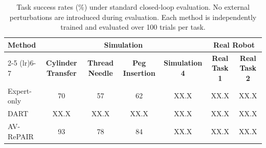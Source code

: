 \documentclass[letterpaper, 10 pt, conference]{ieeeconf}  %
\begin{document}

\begin{table}[t]
    \centering
    \caption{Task success rates (\%) under standard closed-loop evaluation. No external perturbations are introduced during evaluation. Each method is independently trained and evaluated over 100 trials per task.}
    \label{tab:main_results}
    \renewcommand{\arraystretch}{1.0}
    \begin{tabular*}{\textwidth}{
        @{\extracolsep{\fill}}
        lcccccc
        @{}
    }
        \toprule
        \multirow{2}{*}{\textbf{Method}}
        & \multicolumn{4}{c}{\textbf{Simulation}}
        & \multicolumn{2}{c}{\textbf{Real Robot}} \\
        \cmidrule(lr){2-5}
        \cmidrule(lr){6-7}
        & \textbf{Cylinder Transfer}
        & \textbf{Thread Needle}
        & \textbf{Peg Insertion}
        & \textbf{Simulation 4}
        & \textbf{Real Task 1}
        & \textbf{Real Task 2} \\
        \midrule
        Expert-only
        & 70 & 57 & 62
        & XX.X & XX.X & XX.X \\

        DART
        & XX.X & XX.X & XX.X
        & XX.X & XX.X & XX.X \\
        
        
        AV-RePAIR
        & 93 & 78 & 84
        & XX.X & XX.X & XX.X \\
        \bottomrule
    \end{tabular*}
\end{table}
\end{document}
